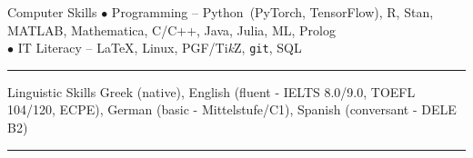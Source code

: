 \documentclass[12pt]{resume}
\begin{document}

\begin{category}{Computer Skills}
\citemnobullet
$\bullet$ Programming -- Python~(PyTorch, TensorFlow), R, Stan, MATLAB,  Mathematica, C/C++, Java, Julia, ML, Prolog\\
$\bullet$ IT Literacy -- \LaTeX, Linux, PGF/Ti\emph{k}Z, \texttt{git}, SQL 

\noindent\rule{\textwidth}{0.2pt}
\end{category}

\iffalse
\begin{category}{Experience in Data Problems}
\citemnobullet - Participation in Kaggle challenges:  Leaf Classification,
Click-Through Rate Prediction, Driver Telematics Analysis,
Sentiment Analysis on Movie Reviews,
Bike Sharing Demand

\citemnobullet - Projects on Machine Learning problems, including: Political Opinion Detection on Twitter, Automatic Recognition System for
Bimodal Detection of Guarding/Stiffness
used for Chronic Low Back Pain Rehabilitation, Prediction of Subcellular Location of Eukaryotic Proteins, Monte-Carlo Control and Temporal Difference Learning in Card Games, Anomaly Detection on Streaming Data, Models Stacking and Averaging for Predictions in Sports 

\citemnobullet - Coursework on state-of-the-art Machine Learning techniques, including: HMMs, Mixture Models, Latent Variable Models, Graphical Models, Gaussian Processes, Kernel Methods, Deep Neural Networks 

\noindent\rule{\textwidth}{0.2pt}
\end{category}
\fi




\begin{category}{Linguistic Skills}
\citemnobullet Greek (native),
 English (fluent - IELTS 8.0/9.0, TOEFL 104/120, ECPE), 
 German (basic - Mittelstufe/C1), 
 Spanish (conversant - DELE B2)
 
 \noindent\rule{\textwidth}{0.2pt}
\end{category}











\end{document}
